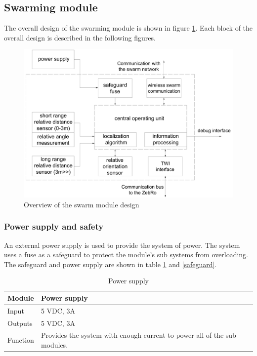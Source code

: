 \documentclass[10pt,a4paper]{article}
\begin{document}
\subsection{Swarming module}
The overall design of the swarming module is shown in figure \ref{overall}. Each block of the overall design is described in the following figures.
\begin{figure}[h]
  \centering
      \includegraphics[width=1\textwidth]{overall.pdf}
  \caption{Overview of the swarm module design}
  \label{overall}
\end{figure}

\subsubsection{Power supply and safety}
An external power supply is used to provide the system of power. The system uses a fuse as a safeguard to protect the module's sub systems from overloading. The safeguard and power supply are shown in table \ref{power-supply} and \ref{safeguard}.

\begin{table}[H]
\centering
\caption{Power supply}
\label{power-supply}
\begin{tabular}{|p{}|p{}|}
\hline
Module   & Power supply                                        \\ \hline
Input    & 5 VDC, 3A                                            \\ \hline
Outputs  & 5 VDC, 3A                                             \\ \hline
Function & Provides the system with enough current to power all of the sub modules. \\ \hline
\end{tabular}
\end{table}
\end{document}
